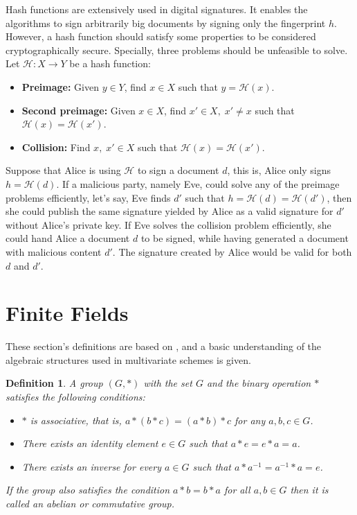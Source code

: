 \documentclass{ufsctex/ufsctex}
\newtheorem{definition}{Definition}
\begin{document}
Hash functions are extensively used in digital signatures. It enables the
algorithms to sign arbitrarily big documents by signing only the fingerprint
$h$. However, a hash function should satisfy some properties to be considered
cryptographically secure. Specially, three problems should be unfeasible to
solve. Let $\mathcal{H}:X \rightarrow Y$ be a hash function:

\begin{itemize}

	\item \textbf{Preimage:} Given $y \in Y$, find $x \in X$ such that $y =
		\mathcal{H}(x)$.

	\item \textbf{Second preimage:} Given $x \in X$, find $x' \in X,\; x' \ne
		x$ such that $\mathcal{H}(x) = \mathcal{H}(x')$.

	\item \textbf{Collision:} Find $x,\; x' \in X$ such that $\mathcal{H}(x) =
		\mathcal{H}(x')$.

\end{itemize}

Suppose that Alice is using $\mathcal{H}$ to sign a document $d$, this is,
Alice only signs $h = \mathcal{H}(d)$. If a malicious party, namely Eve, could
solve any of the preimage problems efficiently, let's say, Eve finds $d'$ such
that $h = \mathcal{H}(d) = \mathcal{H}(d')$, then she could publish the same
signature yielded by Alice as a valid signature for $d'$ without Alice's
private key. If Eve solves the collision problem efficiently, she could hand
Alice a document $d$ to be signed, while having generated a document with
malicious content $d'$. The signature created by Alice would be valid for both
$d$ and $d'$.

\section{Finite Fields}

These section's definitions are based on \cite{lidl1983encyclopedia}, and a
basic understanding of the algebraic structures used in multivariate schemes is
given.

\begin{definition}
A group $(G, *)$ with the set $G$ and the binary operation $*$ satisfies the
following conditions:
\begin{itemize}
	\item $*$ is associative, that is, $a*(b*c) = (a*b)*c$ for any $a, b, c \in
	G$.
	\item There exists an identity element $e \in G$ such that $a * e = e * a =
	a$.
	\item There exists an inverse for every $a \in G$ such that $a*a^{-1} =
	a^{-1}*a = e$.
\end{itemize}
If the group also satisfies the condition $a*b = b*a$ for all $a, b \in G$ then
it is called an abelian or commutative group.
\end{definition}
\end{document}
